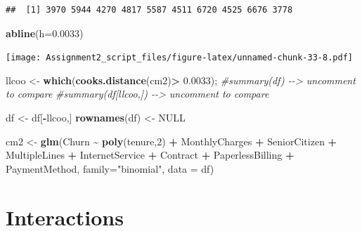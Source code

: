 \documentclass[
]{article}
\newenvironment{Shaded}{\begin{snugshade}}{\end{snugshade}}
\newcommand{\AttributeTok}[1]{\textcolor[rgb]{0.13,0.29,0.53}{#1}}
\newcommand{\CommentTok}[1]{\textcolor[rgb]{0.56,0.35,0.01}{\textit{#1}}}
\newcommand{\ConstantTok}[1]{\textcolor[rgb]{0.56,0.35,0.01}{#1}}
\newcommand{\DecValTok}[1]{\textcolor[rgb]{0.00,0.00,0.81}{#1}}
\newcommand{\FloatTok}[1]{\textcolor[rgb]{0.00,0.00,0.81}{#1}}
\newcommand{\FunctionTok}[1]{\textcolor[rgb]{0.13,0.29,0.53}{\textbf{#1}}}
\newcommand{\NormalTok}[1]{#1}
\newcommand{\OtherTok}[1]{\textcolor[rgb]{0.56,0.35,0.01}{#1}}
\newcommand{\SpecialCharTok}[1]{\textcolor[rgb]{0.81,0.36,0.00}{\textbf{#1}}}
\newcommand{\StringTok}[1]{\textcolor[rgb]{0.31,0.60,0.02}{#1}}
\begin{document}
\begin{verbatim}
##  [1] 3970 5944 4270 4817 5587 4511 6720 4525 6676 3778
\end{verbatim}

\begin{Shaded}
\begin{Highlighting}[]
\FunctionTok{abline}\NormalTok{(}\AttributeTok{h=}\FloatTok{0.0033}\NormalTok{)}
\end{Highlighting}
\end{Shaded}

\texttt{[image: Assignment2\_script\_files/figure-latex/unnamed-chunk-33-8.pdf]}

\begin{Shaded}
\begin{Highlighting}[]
\NormalTok{llcoo }\OtherTok{\textless{}{-}} \FunctionTok{which}\NormalTok{(}\FunctionTok{cooks.distance}\NormalTok{(cm2)}\SpecialCharTok{\textgreater{}} \FloatTok{0.0033}\NormalTok{);}
\CommentTok{\#summary(df)          {-}{-}\textgreater{} uncomment to compare}
\CommentTok{\#summary(df[llcoo,])  {-}{-}\textgreater{} uncomment to compare}

\NormalTok{df }\OtherTok{\textless{}{-}}\NormalTok{ df[}\SpecialCharTok{{-}}\NormalTok{llcoo,]}
\FunctionTok{rownames}\NormalTok{(df) }\OtherTok{\textless{}{-}} \ConstantTok{NULL}
\end{Highlighting}
\end{Shaded}

\begin{Shaded}
\begin{Highlighting}[]
\NormalTok{cm2 }\OtherTok{\textless{}{-}} \FunctionTok{glm}\NormalTok{(Churn }\SpecialCharTok{\textasciitilde{}} \FunctionTok{poly}\NormalTok{(tenure,}\DecValTok{2}\NormalTok{) }\SpecialCharTok{+}\NormalTok{ MonthlyCharges }\SpecialCharTok{+}\NormalTok{ SeniorCitizen }\SpecialCharTok{+}\NormalTok{ MultipleLines }\SpecialCharTok{+}\NormalTok{ InternetService }\SpecialCharTok{+}\NormalTok{ Contract }\SpecialCharTok{+}\NormalTok{ PaperlessBilling }\SpecialCharTok{+}\NormalTok{ PaymentMethod, }\AttributeTok{family=}\StringTok{"binomial"}\NormalTok{, }\AttributeTok{data =}\NormalTok{ df)}
\end{Highlighting}
\end{Shaded}

\hypertarget{interactions}{%
\section{Interactions}\label{interactions}}
\end{document}
